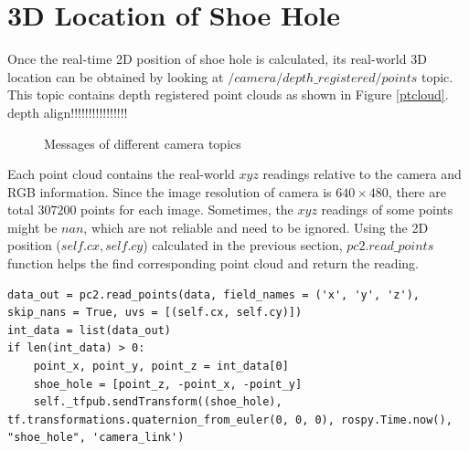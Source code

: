 \section{3D Location of Shoe Hole} \label{3dlocationestimation}
Once the real-time 2D position of shoe hole is calculated, its real-world 3D location can be obtained by looking at $/camera/depth\_registered/points$ topic. This topic contains depth registered point clouds as shown in Figure \ref{ptcloud}. depth align!!!!!!!!!!!!!!!!

\begin{figure}[H]
\centering
{}
\caption{Messages of different camera topics}
\end{figure}

Each point cloud contains the real-world $xyz$ readings relative to the camera and RGB information. Since the image resolution of camera is $640 \times 480$, there are total $307200$ points for each image. Sometimes, the $xyz$ readings of some points might be $nan$, which are not reliable and need to be ignored. Using the 2D position ($self.cx, self.cy$) calculated in the previous section, $pc2.read\_points$ function helps the find corresponding point cloud and return the reading.

\begin{verbatim}
data_out = pc2.read_points(data, field_names = ('x', 'y', 'z'), skip_nans = True, uvs = [(self.cx, self.cy)])
int_data = list(data_out)
if len(int_data) > 0:
    point_x, point_y, point_z = int_data[0]
    shoe_hole = [point_z, -point_x, -point_y]
    self._tfpub.sendTransform((shoe_hole), tf.transformations.quaternion_from_euler(0, 0, 0), rospy.Time.now(), "shoe_hole", 'camera_link')
\end{verbatim}

